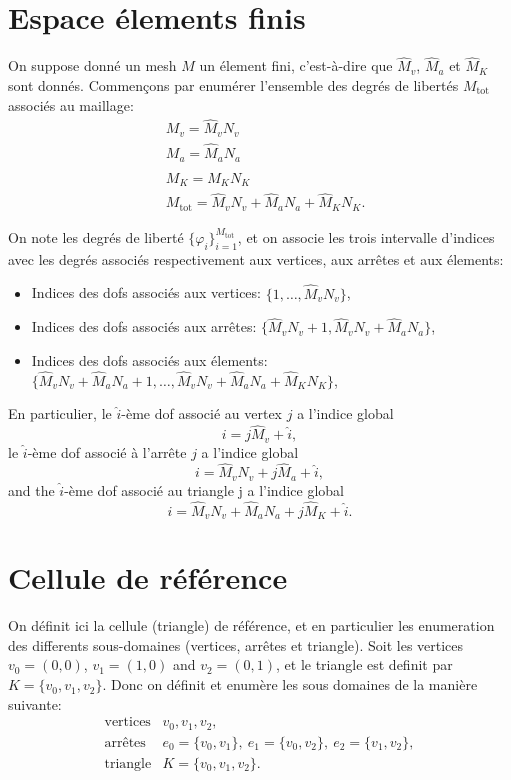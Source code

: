 \section{Espace \'elements finis}
On suppose donn\'e un mesh $M$ un \'element fini, c'est-\`a-dire que
$\hat M_v$, $\hat M_a$ et $\hat M_K$ sont donn\'es. Commen\c cons par
enum\'erer l'ensemble des degr\'es de libert\'es $M_\text{tot}$
associ\'es au maillage: 
\begin{align}
  & M_v = \hat M_v N_v\\
  & M_a = \hat M_a N_a\\
  & M_K = \hat M_K N_K\\
  & M_\text{tot} = \hat M_v N_v + \hat M_a N_a + \hat M_K N_K.
\end{align}

On note les degr\'es de libert\'e $\{\varphi_i\}_{i=1}^{M_\text{tot}}$,
et on associe les trois intervalle d'indices avec les degr\'es
associ\'es respectivement aux vertices, aux arr\^etes et aux
\'elements: 

\begin{itemize}
\item Indices des dofs associ\'es aux vertices: $\{1, \dots, \hat M_v
  N_v\}$,
\item Indices des dofs associ\'es aux arr\^etes: $\{\hat M_v N_v + 1,
  \hat M_v N_v + \hat M_a N_a\}$,
\item Indices des dofs associ\'es aux \'elements: $\{\hat M_v N_v + \hat
  M_a N_a + 1, \dots, \hat M_v N_v + \hat M_a N_a + \hat M_K N_K\}$,
\end{itemize}

En particulier, le $\hat i$-\`eme dof associ\'e au vertex $j$ a l'indice global 
\begin{equation}
  i = j \hat M_v + \hat i,
\end{equation}
le $\hat i$-\`eme dof associ\'e \`a l'arr\^ete $j$ a l'indice global 
\begin{equation}
  i = \hat M_v N_v + j \hat M_a + \hat i,
\end{equation}
and the $\hat i$-\`eme dof associ\'e au triangle j a l'indice global 
\begin{equation}
  i = \hat M_v N_v + \hat M_a N_a + j \hat M_K + \hat i.
\end{equation}

\section{Cellule de r\'ef\'erence}
On d\'efinit ici la cellule (triangle) de r\'ef\'erence, et en
particulier les enumeration des differents sous-domaines (vertices,
arr\^etes et triangle). Soit les vertices $v_0 = (0,0)$, $v_1 =
(1,0)$ and $v_2 = (0,1)$, et le triangle est definit par $K = \{v_0,
v_1, v_2\}$. Donc on d\'efinit et enum\`ere les sous domaines de la
mani\`ere suivante: 
\begin{align}
  \text{vertices} & v_0, v_1, v_2,\\
  \text{arr\^etes} & e_0 = \{v_0, v_1\},\ e_1 = \{v_0, v_2\},\ e_2 =
  \{v_1, v_2\}, \\
  \text{triangle} & K = \{v_0, v_1, v_2\}.
\end{align}

